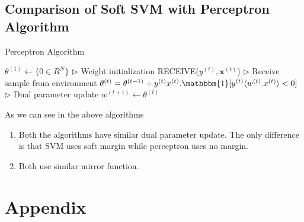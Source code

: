 \documentclass[11pt]{article}
\begin{document}
\subsection{Comparison of Soft SVM with Perceptron Algorithm}

\begin{algorithm}[H]
\caption{Perceptron Algorithm}
\label{algo:softsvm}
\begin{algorithmic}[1]
\STATE $\textbf{\(\theta\)}^{(1)} \leftarrow \{0 \in R^N\}$ \hfill $\triangleright$ Weight initialization
\STATE RECEIVE($y^{(t)}, \boldsymbol{x}^{(t)}$) \hfill $\triangleright$ Receive sample from environment
\STATE $\theta^{(t)} = \theta^{(t-1)} + y^{(t)}{x}^{(t)} . \mathbbm{1} [y^{(t)}\langle w^{(t)} . x^{(t)}\rangle < 0] $ \hfill $\triangleright$ Dual parameter update
\STATE $w^{(t+1)} \leftarrow \theta^{(t)}$
\ENDFOR
\end{algorithmic}
\end{algorithm}

As we can see in the above algorithms
\begin{enumerate}
    \item Both the algorithms have similar dual parameter update. The only difference is that SVM uses soft margin while perceptron uses no margin.
    \item Both use similar mirror function.
\end{enumerate}


\newpage
\section{Appendix}
\end{document}
